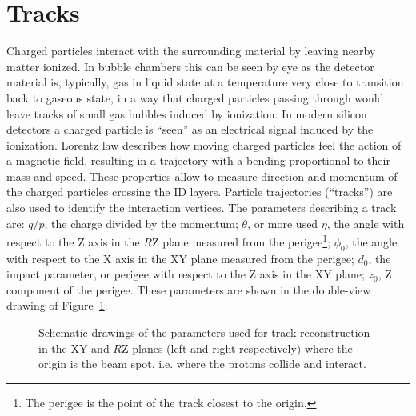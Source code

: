 
\section{Tracks}\label{sec:tracks}

Charged particles interact with the surrounding material by
leaving nearby matter ionized. In bubble chambers this can be
seen by eye as the detector material is, typically, gas in liquid
state at a temperature very close to transition back to gaseous state,
in a way that charged particles passing through would leave tracks of
small gas bubbles induced by ionization. In modern silicon detectors
a charged particle is ``seen'' as an electrical signal induced by the
ionization. Lorentz law describes how moving charged particles
feel the action of a magnetic field, resulting in a trajectory with a
bending proportional to their mass and speed. These properties allow
to measure direction and momentum of the charged particles crossing
the ID layers. Particle trajectories (``tracks'') are 
also used to identify the interaction vertices.
The parameters describing a track are: $q/p$, the charge divided by the momentum; $\theta$, or more used $\eta$, the angle
with respect to the Z axis in the $R$Z plane measured from the 
perigee\footnote{The perigee is the point of the track closest to the origin.}; $\phi_0$, the angle 
with respect to the X axis in the XY plane measured from the perigee; $d_0$, the impact parameter, 
or perigee with respect to the Z axis in the XY plane; $z_0$, Z component of the perigee.
These parameters are shown in the double-view drawing of Figure~\ref{fig:trackpar}.

\begin{figure}[tb]\begin{center}
	\caption[bla]{Schematic drawings of the parameters used for track reconstruction in the XY and $R$Z planes (left and right respectively)
          where the origin is the beam spot, i.e. where the protons collide and interact.
\label{fig:trackpar}}
\end{center}\end{figure}

